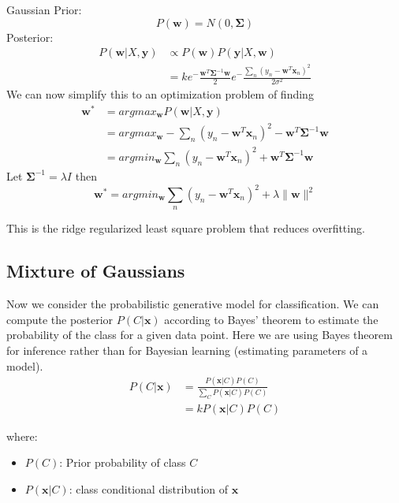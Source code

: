 \documentclass[12pt]{article}
\begin{document}
            Gaussian Prior:
            $$ P(\boldsymbol{w}) = N(0, \boldsymbol{\Sigma}) $$
            Posterior:
            \begin{align*}
                P(\boldsymbol{w} | X, \boldsymbol{y}) &\propto P(\boldsymbol{w})P(\boldsymbol{y}|X, \boldsymbol{w}) \\
                &= ke^-\frac{\boldsymbol{w}^T\boldsymbol{\Sigma}^{-1}\boldsymbol{w}}{2} e^-\frac{\sum_n(y_n - \boldsymbol{w}^T\boldsymbol{x}_n)^2}{2\sigma^2} 
            \end{align*}
            We can now simplify this to an optimization problem of finding
            \begin{align*}
                \boldsymbol{w}^* &= argmax_{\boldsymbol{w}}P(\boldsymbol{w}|X, \boldsymbol{y}) \\
                &= argmax_{\boldsymbol{w}} - \sum_{n} (y_n - \boldsymbol{w}^T\boldsymbol{x}_n)^2 - \boldsymbol{w}^T \boldsymbol{\Sigma}^{-1}\boldsymbol{w} \\
                &= argmin_{\boldsymbol{w}} \sum_{n} (y_n - \boldsymbol{w}^T\boldsymbol{x}_n)^2 + \boldsymbol{w}^T \boldsymbol{\Sigma}^{-1}\boldsymbol{w}
            \end{align*}
            Let $\boldsymbol{\Sigma}^{-1} = \lambda I$ then
            $$ \boldsymbol{w}^* = argmin_{\boldsymbol{w}} \sum_{n} (y_n - \boldsymbol{w}^T\boldsymbol{x}_n)^2 + \lambda \|\boldsymbol{w}\|^2 $$

            This is the ridge regularized least square problem that reduces overfitting.

    \subsection{Mixture of Gaussians}
        Now we consider the probabilistic generative model for classification. We can compute the posterior $P(C|\boldsymbol{x})$ according to Bayes' theorem to estimate the probability of the class for a given data point. Here we are using
        Bayes theorem for inference rather than for Bayesian learning (estimating parameters of a model).
        \begin{align*}
            P(C|\boldsymbol{x}) &= \frac{P(\boldsymbol{x}|C)P(C)}{\sum_C P(\boldsymbol{x}|C)P(C)} \\
            &= k P(\boldsymbol{x}|C)P(C)
        \end{align*}

        where:
        \begin{itemize}
            \item $P(C)$: Prior probability of class $C$
            \item $P(\boldsymbol{x}|C)$: class conditional distribution of $\boldsymbol{x}$
        \end{itemize}
\end{document}
